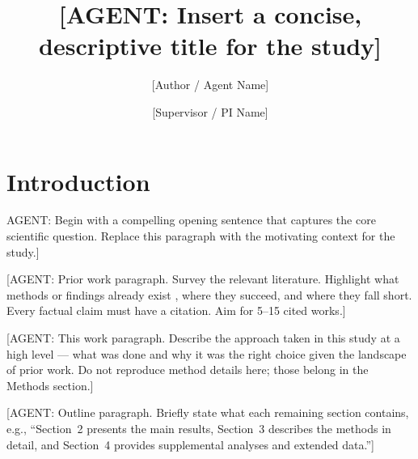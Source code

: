 \documentclass[9pt,a4paper,twocolumn,twoside]{rho-class/rho}
\title{[AGENT: Insert a concise, descriptive title for the study]}
\author[{\textasteriskcentered},a,1]{[Author / Agent Name]}
\author[{\textdagger},b,2]{[Supervisor / PI Name]}
\affil[a]{[Primary affiliation — department, institution]}
\affil[b]{[Supervisor affiliation — department, institution]}
\begin{document}
    \maketitle
    \thispagestyle{firststyle}

%
%
%
%

\section{Introduction}

    \rhostart{[}AGENT: Begin with a compelling opening
    sentence that captures the core scientific question.
    Replace this paragraph with the motivating context
    for the study.]

    [AGENT: Prior work paragraph. Survey the relevant
    literature. Highlight what methods or findings already
    exist \cite{example_ref_1}, where they succeed, and
    where they fall short. Every factual claim must have
    a citation. Aim for 5--15 cited works.]

    [AGENT: This work paragraph. Describe the approach
    taken in this study at a high level — what was done
    and why it was the right choice given the landscape
    of prior work. Do not reproduce method details here;
    those belong in the Methods section.]

    [AGENT: Outline paragraph. Briefly state what each
    remaining section contains, e.g., ``Section~2
    presents the main results, Section~3 describes the
    methods in detail, and Section~4 provides supplemental
    analyses and extended data.'']
\end{document}
